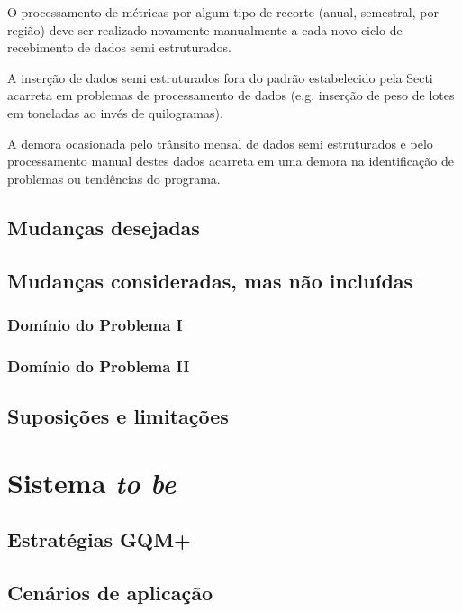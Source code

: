 \documentclass[
	12pt,				%
	openright,			%
	twoside,			%
	a4paper,			%
	english,			%
	french,				%
	spanish,			%
	brazil,				%
	]{abntex2}
\begin{document}
    O processamento de métricas por algum tipo de recorte (anual, semestral, por região) deve ser realizado novamente manualmente a cada novo ciclo de recebimento de dados semi estruturados.

    A inserção de dados semi estruturados fora do padrão estabelecido pela Secti acarreta em problemas de processamento de dados (e.g. inserção de peso de lotes em toneladas ao invés de quilogramas).

    A demora ocasionada pelo trânsito mensal de dados semi estruturados e pelo processamento manual destes dados acarreta em uma demora na identificação de problemas ou tendências do programa.


\chapter{Mudanças desejadas}
\chapter{Mudanças consideradas, mas não incluídas}
\section{Domínio do Problema I}
\section{Domínio do Problema II}
\chapter{Suposições e limitações}



\part{Sistema \textit{to be}}
\chapter{Estratégias GQM+}
\chapter{Cenários de aplicação}
\end{document}

